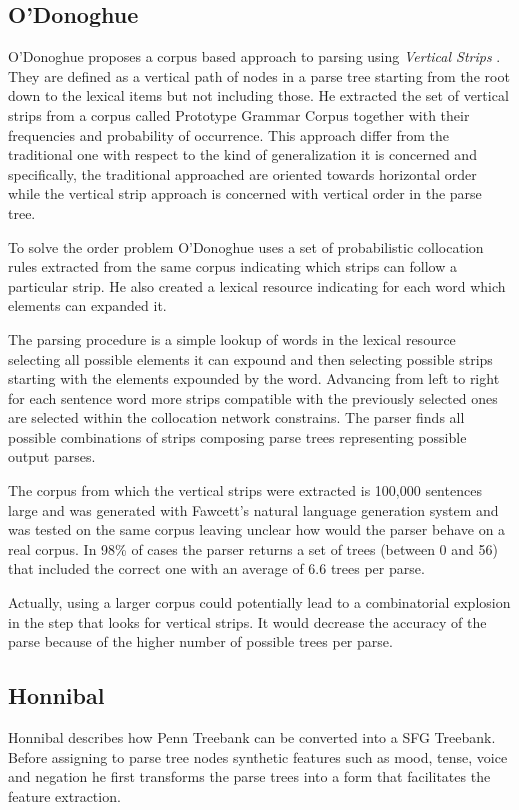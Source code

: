 \subsection{O'Donoghue}
O'Donoghue proposes a corpus based approach to parsing using \textit{Vertical Strips} \citep{ODonoghue1991a}. They are defined as a vertical path of nodes in a parse tree starting from the root down to the lexical items but not including those. He extracted the set of vertical strips from a corpus called Prototype Grammar Corpus together with their frequencies and probability of occurrence.
This approach differ from the traditional one with respect to the kind of generalization it is concerned and specifically, the traditional approached are oriented towards horizontal order while the vertical strip approach is concerned with vertical order in the parse tree. 

To solve the order problem O'Donoghue uses a set of probabilistic collocation rules extracted from the same corpus indicating which strips can follow a particular strip. He also created a lexical resource indicating for each word which elements can expanded it.

The parsing procedure is a simple lookup of words in the lexical resource selecting all possible elements it can expound and then selecting possible strips starting with the elements expounded by the word. Advancing from left to right for each sentence word more strips compatible with the previously selected ones are selected within the collocation network constrains. The parser finds all possible combinations of strips composing parse trees representing possible output parses. 

The corpus from which the vertical strips were extracted is 100,000 sentences large and was generated with Fawcett's natural language generation system and was tested on the same corpus leaving unclear how would the parser behave on a real corpus. In 98\% of cases the parser returns a set of trees (between 0 and 56) that included the correct one with an average of 6.6 trees per parse. 

Actually, using a larger corpus could potentially lead to a combinatorial explosion in the step that looks for vertical strips. It would decrease the accuracy of the parse because of the higher number of possible trees per parse.

\subsection{Honnibal}
Honnibal \citeyearpar{Honnibal2004a,Honnibal2007} describes how Penn Treebank can be converted into a SFG Treebank. Before assigning to parse tree nodes synthetic features such as mood, tense, voice and negation he first transforms the parse trees into a form that facilitates the feature extraction. 

